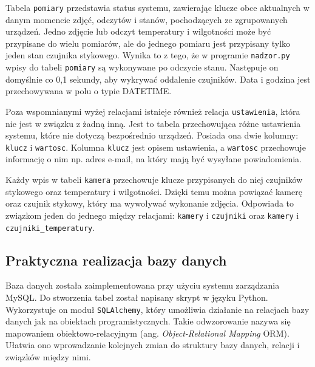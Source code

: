 \documentclass[a4paper,11pt,twoside]{article}
\begin{document}
Tabela \texttt{pomiary} przedstawia status systemu, zawierając klucze obce aktualnych w danym momencie zdjęć, odczytów i stanów, pochodzących ze zgrupowanych urządzeń. Jedno zdjęcie lub odczyt temperatury i wilgotności może być przypisane do wielu pomiarów, ale do jednego pomiaru jest przypisany tylko jeden stan czujnika stykowego. Wynika to z tego, że w programie \texttt{nadzor.py} wpisy do tabeli \texttt{pomiary} są wykonywane po odczycie stanu. Następuje on domyślnie co 0,1 sekundy, aby wykrywać oddalenie czujników. Data i godzina jest przechowywana w polu o typie DATETIME. 
 
Poza wspomnianymi wyżej relacjami istnieje również relacja \texttt{ustawienia}, która nie jest w związku z żadną inną. Jest to tabela przechowująca różne ustawienia systemu, które nie dotyczą bezpośrednio urządzeń. Posiada ona dwie kolumny: \texttt{klucz} i \texttt{wartosc}. Kolumna \texttt{klucz} jest opisem ustawienia, a \texttt{wartosc} przechowuje informację o nim np. adres e-mail, na który mają być wysyłane powiadomienia. 

Każdy wpis w tabeli \texttt{kamera} przechowuje klucze przypisanych do niej czujników stykowego oraz temperatury i wilgotności. Dzięki temu można powiązać kamerę oraz czujnik stykowy, który ma wywoływać wykonanie zdjęcia. Odpowiada to związkom jeden do jednego między relacjami: \texttt{kamery} i \texttt{czujniki} oraz \texttt{kamery} i \texttt{czujniki{\_}temperatury}.

\subsection{Praktyczna realizacja bazy danych}
Baza danych została zaimplementowana przy użyciu systemu zarządzania MySQL. Do stworzenia tabel został napisany skrypt w języku Python. Wykorzystuje on moduł \texttt{SQLAlchemy}, który umożliwia działanie na relacjach bazy danych jak na obiektach programistycznych. Takie odwzorowanie nazywa się mapowaniem obiektowo-relacyjnym (ang. \textit{Object-Relational Mapping} ORM). Ułatwia ono wprowadzanie kolejnych zmian do struktury bazy danych, relacji i związków między nimi.
\end{document}
